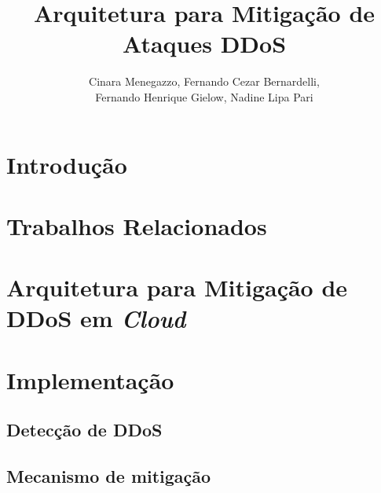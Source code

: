 \documentclass[a4paper, 12pt]{article}
\begin{document}
\title{Arquitetura para Mitigação de Ataques DDoS}

\author{
Cinara Menegazzo,
Fernando Cezar Bernardelli, \\
Fernando Henrique Gielow,
Nadine Lipa Pari
}
   

   
\address{Departamento de Informática -- Universidade Federal do Paraná\\
NR2 - Núcleo de Redes Sem Fio e Redes Avançadas\\
  Caixa Postal 19.081 -- 81.531-980 -- Curitiba -- PR -- Brasil
}     

\maketitle


\begin{resumo}

\end{resumo}



\section{Introdução}



\section{Trabalhos Relacionados}

 



\section{Arquitetura para Mitigação de DDoS em \emph{Cloud}}



\section{Implementação}

\subsection{Detecção de DDoS}


\subsection{Mecanismo de mitigação}

\end{document}

